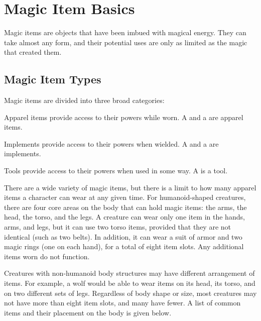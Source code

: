 \chapter{Magic Item Basics}
Magic items are objects that have been imbued with magical energy. They can take almost any form, and their potential uses are only as limited as the magic that created them.

\section{Magic Item Types}
Magic items are divided into three broad categories:
\begin{itemize*}
  \item Apparel items provide access to their powers while worn. A  and a  are apparel items.
  \item Implements provide access to their powers when wielded. A  and a  are implements.
  \item Tools provide access to their powers when used in some way. A  is a tool.
\end{itemize*}

 There are a wide variety of magic items, but there is a limit to how many apparel items a character can wear at any given time. For humanoid-shaped creatures, there are four core areas on the body that can hold magic items: the arms, the head, the torso, and the legs. A creature can wear only one item in the hands, arms, and legs, but it can use two torso items, provided that they are not identical (such as two belts). In addition, it can wear a suit of armor and two magic rings (one on each hand), for a total of eight item slots. Any additional items worn do not function.

Creatures with non-humanoid body structures may have different arrangement of items. For example, a wolf would be able to wear items on its head, its torso, and on two different sets of legs. Regardless of body shape or size, most creatures may not have more than eight item slots, and many have fewer. A list of common items and their placement on the body is given below.

